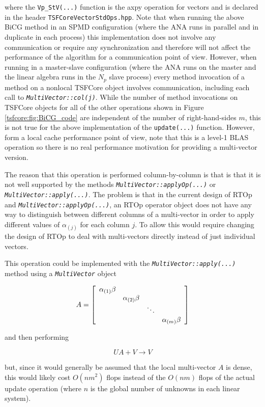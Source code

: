\documentclass[10pt,fleqn]{article}
\begin{document}
where the \texttt{Vp\_StV(...)} function is the axpy operation for
vectors and is declared in the header \texttt{TSFCoreVectorStdOps.hpp}.  Note
that when running the above BiCG method in an SPMD configuration
(where the ANA runs in parallel and in duplicate in each process) this
implementation does not involve any communication or require any
synchronization and therefore will not affect the performance of the
algorithm for a communication point of view.  However, when running in
a master-slave configuration (where the ANA runs on the master and the
linear algebra runs in the $N_p$ slave process) every method
invocation of a method on a nonlocal TSFCore object involves
communication, including each call to
\texttt{\textit{MultiVector\-::col(j)}}.  While the number of method
invocations on TSFCore objects for all of the other operations shown in
Figure \ref{tsfcore:fig:BiCG_code} are independent of the number of
right-hand-sides $m$, this is not true for the above implementation of
the \texttt{update(...)} function.  However, form a local cache
performance point of view, note that this is a level-1 BLAS operation
so there is no real performance motivation for providing a
multi-vector version.

The reason that this operation is performed column-by-column is that
is that it is not well supported by the methods
\texttt{\textit{MultiVector\-::applyOp(...)}} or
\texttt{\textit{MultiVector\-::apply(...)}}.  The problem is that in
the current design of RTOp and
\texttt{\textit{MultiVector\-::applyOp(...)}}, an RTOp operator object
does not have any way to distinguish between different columns of a
multi-vector in order to apply different values of $\alpha_{(j)}$ for
each column $j$.  To allow this would require changing the design of
RTOp to deal with multi-vectors directly instead of just individual
vectors.

This operation could be implemented with the
\texttt{\textit{MultiVector\-::apply(...)}} method using a
\texttt{\textit{MultiVector}} object

\[
A = {\bmat{cccc} \alpha_{(1)} \beta \\ & \alpha_{(2)} \beta \\ & & \ddots \\ & & & \alpha_{(m)} \beta \emat}
\]

and then performing

\[
U A + V \rightarrow V
\]

but, since it would generally be assumed that the local multi-vector
$A$ is dense, this would likely cost $O(n m^2)$ flops instead of the
$O(n m)$ flops of the actual update operation (where $n$ is the global
number of unknowns in each linear system).
\end{document}
